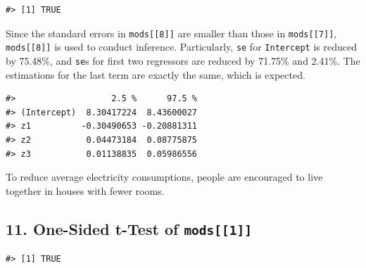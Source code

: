 \documentclass[a4paper]{article}
\newenvironment{Shaded}{\begin{snugshade}}{\end{snugshade}}
\newcommand{\DataTypeTok}[1]{\textcolor[rgb]{0.13,0.29,0.53}{#1}}
\newcommand{\DecValTok}[1]{\textcolor[rgb]{0.00,0.00,0.81}{#1}}
\newcommand{\FloatTok}[1]{\textcolor[rgb]{0.00,0.00,0.81}{#1}}
\newcommand{\KeywordTok}[1]{\textcolor[rgb]{0.13,0.29,0.53}{\textbf{#1}}}
\newcommand{\NormalTok}[1]{#1}
\newcommand{\OperatorTok}[1]{\textcolor[rgb]{0.81,0.36,0.00}{\textbf{#1}}}
\newcommand{\OtherTok}[1]{\textcolor[rgb]{0.56,0.35,0.01}{#1}}
\newcommand{\StringTok}[1]{\textcolor[rgb]{0.31,0.60,0.02}{#1}}
\begin{document}
\begin{verbatim}
#> [1] TRUE
\end{verbatim}

Since the standard errors in \texttt{mods{[}{[}8{]}{]}} are smaller than
those in \texttt{mods{[}{[}7{]}{]}}, \texttt{mods{[}{[}8{]}{]}} is used
to conduct inference. Particularly, \texttt{se} for \texttt{Intercept}
is reduced by 75.48\%, and \texttt{se}s for first two regressors are
reduced by 71.75\% and 2.41\%. The estimations for the last term are
exactly the same, which is expected.

\begin{verbatim}
#>                   2.5 %      97.5 %
#> (Intercept)  8.30417224  8.43600027
#> z1          -0.30490653 -0.20881311
#> z2           0.04473184  0.08775875
#> z3           0.01138835  0.05986556
\end{verbatim}

To reduce average electricity consumptions, people are encouraged to
live together in houses with fewer rooms.

\hypertarget{one-sided-t-test-of-mods1}{%
\subsection{\texorpdfstring{11. One-Sided t-Test of
\texttt{mods{[}{[}1{]}{]}}}{11. One-Sided t-Test of mods{[}{[}1{]}{]}}}\label{one-sided-t-test-of-mods1}}

\begin{Shaded}
\end{Shaded}

\begin{verbatim}
#> [1] TRUE
\end{verbatim}
\end{document}
